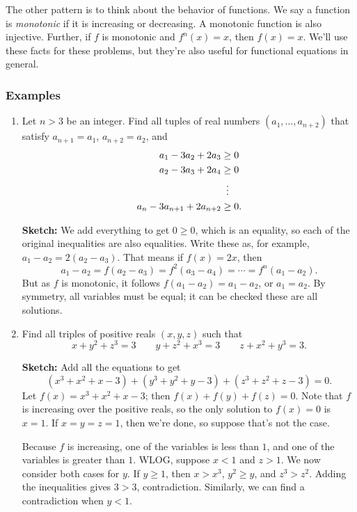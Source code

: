 \documentclass[11pt,paper=letter]{scrartcl}
\begin{document}
The other pattern is to think about the behavior of functions. We say a function is \textit{monotonic} if it is increasing or decreasing. A monotonic function is also injective. Further, if $f$ is monotonic and $f^n(x) = x$, then $f(x) = x$. We'll use these facts for these problems, but they're also useful for functional equations in general.

\subsubsection*{Examples}

\begin{enumerate}

\item Let $n > 3$ be an integer. Find all tuples of real numbers $(a_1, \ldots, a_{n+2})$ that satisfy $a_{n+1} = a_1$, $a_{n+2} = a_2$, and
\begin{align*}
  a_1 - 3a_2 + 2a_3 &\ge 0 \\
  a_2 - 3a_3 + 2a_4 &\ge 0 \\
  & \vdotswithin{=} \\
  a_n - 3a_{n+1} + 2a_{n+2} &\ge 0.
\end{align*}

\textbf{Sketch:} We add everything to get $0 \ge 0$, which is an equality, so each of the original inequalities are also equalities. Write these as, for example, $a_1 - a_2 = 2(a_2 - a_3)$. That means if $f(x) = 2x$, then \[
  a_1 - a_2 = f(a_2 - a_3) = f^2(a_3 - a_4) = \cdots = f^n(a_1 - a_2).
\]
But as $f$ is monotonic, it follows $f(a_1 - a_2) = a_1 - a_2$, or $a_1 = a_2$. By symmetry, all variables must be equal; it can be checked these are all solutions.

\item Find all triples of positive reals $(x, y, z)$ such that \[
x + y^2 + z^3 = 3 \qquad
y + z^2 + x^3 = 3 \qquad
z + x^2 + y^3 = 3.
\]

\textbf{Sketch:} Add all the equations to get \[
  (x^3 + x^2 + x - 3)
  + (y^3 + y^2 + y - 3)
  + (z^3 + z^2 + z - 3)
  = 0.
\]
Let $f(x) = x^3 + x^2 + x - 3$; then $f(x) + f(y) + f(z) = 0$. Note that $f$ is increasing over the positive reals, so the only solution to $f(x) = 0$ is $x = 1$. If $x = y = z = 1$, then we're done, so suppose that's not the case.

Because $f$ is increasing, one of the variables is less than $1$, and one of the variables is greater than $1$. WLOG, suppose $x < 1$ and $z > 1$. We now consider both cases for $y$. If $y \ge 1$, then $x > x^3$, $y^2 \ge y$, and $z^3 > z^2$. Adding the inequalities gives $3 > 3$, contradiction. Similarly, we can find a contradiction when $y < 1$.


\end{enumerate}
\end{document}
